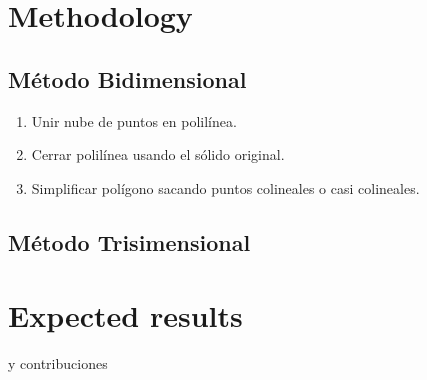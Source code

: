 \documentclass[submission]{eptcs}
\begin{document}
\section{Methodology}

\subsection{Método Bidimensional}
\begin{enumerate}
    \item Unir nube de puntos en polilínea.
    \item Cerrar polilínea usando el sólido original.
    \item Simplificar polígono sacando puntos colineales o casi colineales.
\end{enumerate}
\subsection{Método Trisimensional}

\section{Expected results}

 y contribuciones

\nocite{*}


\end{document}
